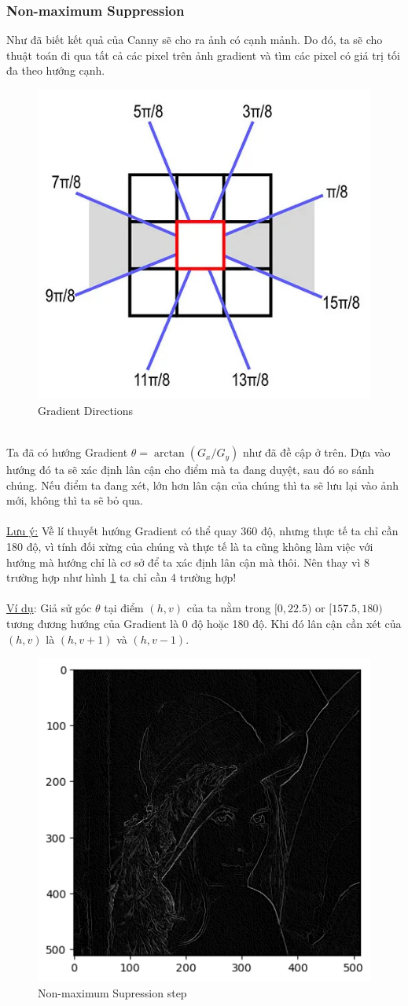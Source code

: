 \documentclass{article}
\begin{document}
    \subsubsection{Non-maximum Suppression}
    Như đã biết kết quả của Canny sẽ cho ra ảnh có cạnh mảnh. Do đó, ta sẽ cho
    thuật toán đi qua tất cả các pixel trên ảnh gradient và tìm các pixel có giá trị tối đa theo hướng cạnh.\\
    \begin{figure}[ht!]
        \centering
        \includegraphics[width = 0.5\linewidth]{fig9.jpg}
        \caption{Gradient Directions}
        \label{fig10}
    \end{figure}\phantom{a}\\
    Ta đã có hướng Gradient $\theta = \arctan (G_x/G_y)$ như đã đề cập ở trên.  Dựa vào hướng đó ta sẽ xác định lân cận cho điểm mà ta đang duyệt, sau đó so sánh chúng. Nếu điểm ta đang xét, lớn hơn lân cận của chúng thì ta sẽ lưu lại vào ảnh mới, không thì ta sẽ bỏ qua.\\\\
    \underline{Lưu ý:} Về lí thuyết hướng Gradient có thể quay 360 độ, nhưng thực tế ta chỉ cần 180 độ, vì tính đối xừng của chúng và thực tế là ta cũng không làm việc với hướng mà hướng chỉ là cơ sở để ta xác định lân cận mà thôi. Nên thay vì 8 trường hợp như hình \ref{fig10} ta chỉ cần 4 trường hợp!\\\\
    \underline{Ví dụ}: Giả sử góc $\theta$ tại điểm $(h,v)$ của ta nằm trong $[0,22.5) \text{ or } [157.5, 180)$ tương đương hướng của Gradient là 0 độ hoặc 180 độ. Khi đó lân cận cần xét của $(h,v)$ là $(h,v+1)$ và $(h,v-1)$.
    \begin{figure}[ht!]
        \centering
        \includegraphics[width = 0.5\linewidth]{fig10.png}
        \caption{Non-maximum Supression step}
        \label{fig11}
    \end{figure}
\end{document}
